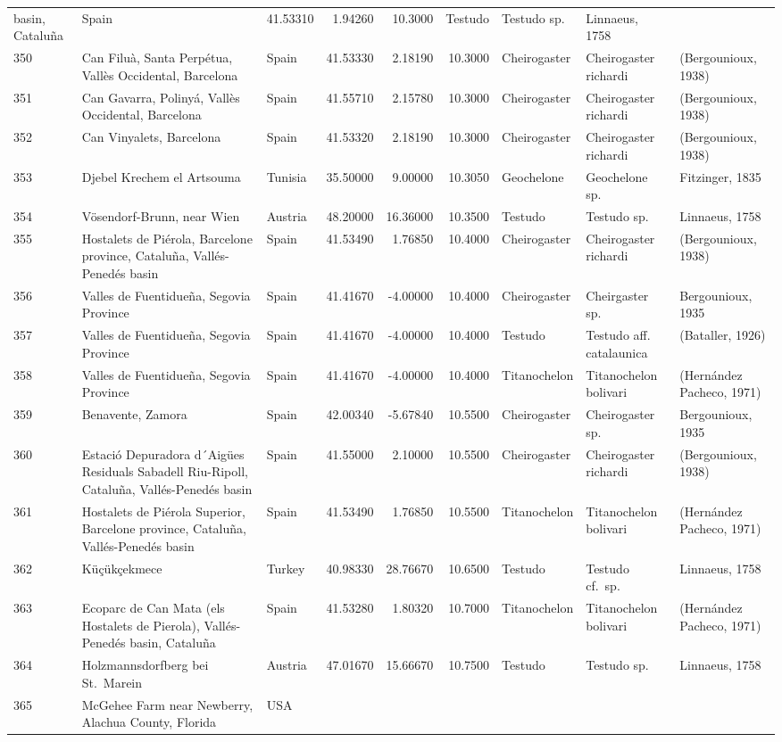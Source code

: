 \documentclass[]{article}
\begin{document}
\begin{longtable}[]{@{}lllrrrlll@{}}
basin, Cataluña & Spain & 41.53310 & 1.94260 & 10.3000 & Testudo &
Testudo sp. & Linnaeus, 1758\tabularnewline
350 & Can Filuà, Santa Perpétua, Vallès Occidental, Barcelona & Spain &
41.53330 & 2.18190 & 10.3000 & Cheirogaster & Cheirogaster richardi &
(Bergounioux, 1938)\tabularnewline
351 & Can Gavarra, Polinyá, Vallès Occidental, Barcelona & Spain &
41.55710 & 2.15780 & 10.3000 & Cheirogaster & Cheirogaster richardi &
(Bergounioux, 1938)\tabularnewline
352 & Can Vinyalets, Barcelona & Spain & 41.53320 & 2.18190 & 10.3000 &
Cheirogaster & Cheirogaster richardi & (Bergounioux,
1938)\tabularnewline
353 & Djebel Krechem el Artsouma & Tunisia & 35.50000 & 9.00000 &
10.3050 & Geochelone & Geochelone sp. & Fitzinger, 1835\tabularnewline
354 & Vösendorf-Brunn, near Wien & Austria & 48.20000 & 16.36000 &
10.3500 & Testudo & Testudo sp. & Linnaeus, 1758\tabularnewline
355 & Hostalets de Piérola, Barcelone province, Cataluña, Vallés-Penedés
basin & Spain & 41.53490 & 1.76850 & 10.4000 & Cheirogaster &
Cheirogaster richardi & (Bergounioux, 1938)\tabularnewline
356 & Valles de Fuentidueña, Segovia Province & Spain & 41.41670 &
-4.00000 & 10.4000 & Cheirogaster & Cheirgaster sp. & Bergounioux,
1935\tabularnewline
357 & Valles de Fuentidueña, Segovia Province & Spain & 41.41670 &
-4.00000 & 10.4000 & Testudo & Testudo aff. catalaunica & (Bataller,
1926)\tabularnewline
358 & Valles de Fuentidueña, Segovia Province & Spain & 41.41670 &
-4.00000 & 10.4000 & Titanochelon & Titanochelon bolivari & (Hernández
Pacheco, 1971)\tabularnewline
359 & Benavente, Zamora & Spain & 42.00340 & -5.67840 & 10.5500 &
Cheirogaster & Cheirogaster sp. & Bergounioux, 1935\tabularnewline
360 & Estació Depuradora d´Aigües Residuals Sabadell Riu-Ripoll,
Cataluña, Vallés-Penedés basin & Spain & 41.55000 & 2.10000 & 10.5500 &
Cheirogaster & Cheirogaster richardi & (Bergounioux,
1938)\tabularnewline
361 & Hostalets de Piérola Superior, Barcelone province, Cataluña,
Vallés-Penedés basin & Spain & 41.53490 & 1.76850 & 10.5500 &
Titanochelon & Titanochelon bolivari & (Hernández Pacheco,
1971)\tabularnewline
362 & Küçükçekmece & Turkey & 40.98330 & 28.76670 & 10.6500 & Testudo &
Testudo cf.~sp. & Linnaeus, 1758\tabularnewline
363 & Ecoparc de Can Mata (els Hostalets de Pierola), Vallés-Penedés
basin, Cataluña & Spain & 41.53280 & 1.80320 & 10.7000 & Titanochelon &
Titanochelon bolivari & (Hernández Pacheco, 1971)\tabularnewline
364 & Holzmannsdorfberg bei St.~Marein & Austria & 47.01670 & 15.66670 &
10.7500 & Testudo & Testudo sp. & Linnaeus, 1758\tabularnewline
365 & McGehee Farm near Newberry, Alachua County, Florida & USA &

\end{longtable}
\end{document}
